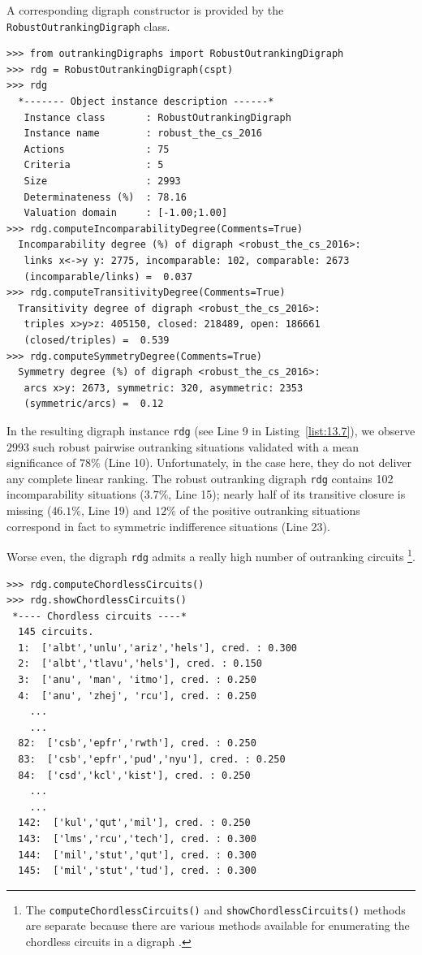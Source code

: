 A corresponding digraph constructor is provided by the \texttt{RobustOutranking\-Digraph} class.
\begin{lstlisting}[caption={Computing the robust outranking digraph},label=list:13.7]
>>> from outrankingDigraphs import RobustOutrankingDigraph	     
>>> rdg = RobustOutrankingDigraph(cspt)
>>> rdg
  *------- Object instance description ------*
   Instance class       : RobustOutrankingDigraph
   Instance name        : robust_the_cs_2016
   Actions              : 75
   Criteria             : 5
   Size                 : 2993
   Determinateness (%)  : 78.16
   Valuation domain     : [-1.00;1.00]
>>> rdg.computeIncomparabilityDegree(Comments=True)
  Incomparability degree (%) of digraph <robust_the_cs_2016>:
   links x<->y y: 2775, incomparable: 102, comparable: 2673
   (incomparable/links) =  0.037
>>> rdg.computeTransitivityDegree(Comments=True)
  Transitivity degree of digraph <robust_the_cs_2016>:
   triples x>y>z: 405150, closed: 218489, open: 186661
   (closed/triples) =  0.539
>>> rdg.computeSymmetryDegree(Comments=True)
  Symmetry degree (%) of digraph <robust_the_cs_2016>:
   arcs x>y: 2673, symmetric: 320, asymmetric: 2353
   (symmetric/arcs) =  0.12
\end{lstlisting}

In the resulting digraph instance \texttt{rdg} (see Line 9 in Listing~\vref{list:13.7}), we observe $2993$ such robust pairwise outranking situations validated with a mean significance of $78\%$ (Line 10). Unfortunately, in the case here, they do not deliver any complete linear ranking. The robust outranking digraph \texttt{rdg} contains 102 incomparability situations ($3.7\%$, Line 15); nearly half of its transitive closure is missing ($46.1\%$, Line 19) and $12\%$ of the positive outranking situations correspond in fact to symmetric indifference situations (Line 23).

Worse even, the digraph \texttt{rdg} admits a really high number of outranking circuits \footnote{The \texttt{computeChordlessCircuits()} and \texttt{showChordlessCircuits()} methods are separate because there are various methods available for enumerating the chordless circuits in a digraph \citep{BIS-2010}.}.
\begin{lstlisting}[caption={Inspecting outranking circuits},label=list:13.8]
>>> rdg.computeChordlessCircuits()
>>> rdg.showChordlessCircuits()
 *---- Chordless circuits ----*
  145 circuits.
  1:  ['albt','unlu','ariz','hels'], cred. : 0.300
  2:  ['albt','tlavu','hels'], cred. : 0.150
  3:  ['anu', 'man', 'itmo'], cred. : 0.250
  4:  ['anu', 'zhej', 'rcu'], cred. : 0.250
    ...
    ...
  82:  ['csb','epfr','rwth'], cred. : 0.250
  83:  ['csb','epfr','pud','nyu'], cred. : 0.250
  84:  ['csd','kcl','kist'], cred. : 0.250
    ...
    ...
  142:  ['kul','qut','mil'], cred. : 0.250
  143:  ['lms','rcu','tech'], cred. : 0.300
  144:  ['mil','stut','qut'], cred. : 0.300
  145:  ['mil','stut','tud'], cred. : 0.300
\end{lstlisting}

